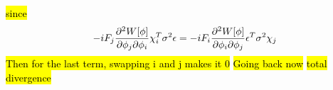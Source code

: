 \documentclass[11pt]{article}
\begin{document}
{{	}
	\hl{since}
	$$- i F_j \pdv{W[\phi]}{\phi_j}{\phi_i} \,\! \chi_i^T \sigma^2 \epsilon = - i F_i \pdv{W[\phi]}{\phi_i}{\phi_j} \,\! \epsilon^T \sigma^2 \chi_j $$
	\hl{Then for the last term, swapping i and j makes it 0}
	\hl{Going back now}
	\hl{total divergence}
}






%





%



\end{document}
